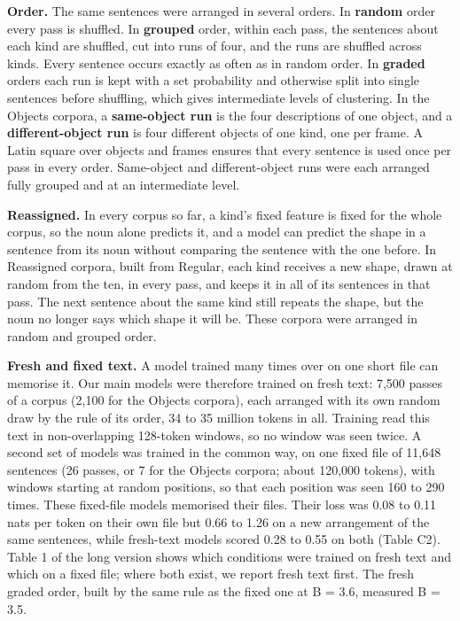 \textbf{Order.} The same sentences were arranged in several orders. In \textbf{random} order every pass is shuffled. In \textbf{grouped} order, within each pass, the sentences about each kind are shuffled, cut into runs of four, and the runs are shuffled across kinds. Every sentence occurs exactly as often as in random order. In \textbf{graded} orders each run is kept with a set probability and otherwise split into single sentences before shuffling, which gives intermediate levels of clustering. In the Objects corpora, a \textbf{same-object run} is the four descriptions of one object, and a \textbf{different-object run} is four different objects of one kind, one per frame. A Latin square over objects and frames ensures that every sentence is used once per pass in every order. Same-object and different-object runs were each arranged fully grouped and at an intermediate level.

\textbf{Reassigned.} In every corpus so far, a kind's fixed feature is fixed for the whole corpus, so the noun alone predicts it, and a model can predict the shape in a sentence from its noun without comparing the sentence with the one before. In Reassigned corpora, built from Regular, each kind receives a new shape, drawn at random from the ten, in every pass, and keeps it in all of its sentences in that pass. The next sentence about the same kind still repeats the shape, but the noun no longer says which shape it will be. These corpora were arranged in random and grouped order.

\textbf{Fresh and fixed text.} A model trained many times over on one short file can memorise it. Our main models were therefore trained on fresh text: 7,500 passes of a corpus (2,100 for the Objects corpora), each arranged with its own random draw by the rule of its order, 34 to 35 million tokens in all. Training read this text in non-overlapping 128-token windows, so no window was seen twice. A second set of models was trained in the common way, on one fixed file of 11,648 sentences (26 passes, or 7 for the Objects corpora; about 120,000 tokens), with windows starting at random positions, so that each position was seen 160 to 290 times. These fixed-file models memorised their files. Their loss was 0.08 to 0.11 nats per token on their own file but 0.66 to 1.26 on a new arrangement of the same sentences, while fresh-text models scored 0.28 to 0.55 on both (Table C2). Table 1 of the long version shows which conditions were trained on fresh text and which on a fixed file; where both exist, we report fresh text first. The fresh graded order, built by the same rule as the fixed one at B = 3.6, measured B = 3.5.

